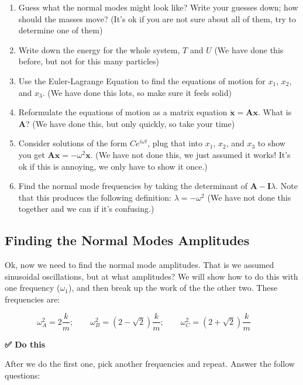 \begin{enumerate}
\def\labelenumi{\arabic{enumi}.}
\tightlist
\item
  Guess what the normal modes might look like? Write your guesses down;
  how should the masses move? (It's ok if you are not sure about all of
  them, try to determine one of them)
\item
  Write down the energy for the whole system, \(T\) and \(U\) (We have
  done this before, but not for this many particles)
\item
  Use the Euler-Lagrange Equation to find the equations of motion for
  \(x_1\), \(x_2\), and \(x_3\). (We have done this lots, so make sure
  it feels solid)
\item
  Reformulate the equations of motion as a matrix equation
  \(\ddot{\mathbf{x}} = \mathbf{A} \mathbf{x}\). What is \(\mathbf{A}\)?
  (We have done this, but only quickly, so take your time)
\item
  Consider solutions of the form \(Ce^{i{\omega}t}\), plug that into
  \(x_1\), \(x_2\), and \(x_3\) to show you get
  \(\mathbf{A}\mathbf{x} = -\omega^2 \mathbf{x}\). (We have not done
  this, we just assumed it works! It's ok if this is annoying, we only
  have to show it once.)
\item
  Find the normal mode frequencies by taking the determinant of
  \(\mathbf{A} - \mathbf{I}\lambda\). Note that this produces the
  following definition: \(\lambda = -\omega^2\) (We have not done this
  together and we can if it's confusing.)
\end{enumerate}

\subsection{Finding the Normal Modes
Amplitudes}\label{finding-the-normal-modes-amplitudes}

Ok, now we need to find the normal mode amplitudes. That is we assumed
sinusoidal oscillations, but at what amplitudes? We will show how to do
this with one frequency (\(\omega_1\)), and then break up the work of
the the other two. These frequencies are:

\[\omega^2_A = 2\dfrac{k}{m}; \qquad \omega^2_B = \left(2-\sqrt{2}\right)\dfrac{k}{m}; \qquad \omega^2_C = \left(2+\sqrt{2}\right)\dfrac{k}{m}\qquad\]

\textbf{✅ Do this}

After we do the first one, pick another frequencies and repeat. Answer
the follow questions:

